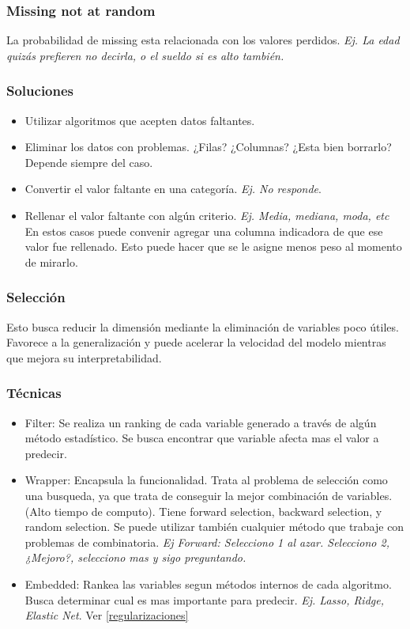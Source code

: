 \documentclass[titlepage,a4paper]{article}
\begin{document}
\subsubsection*{Missing not at random}
La probabilidad de missing esta relacionada con los valores perdidos. \textit{Ej. La edad quizás prefieren no decirla, o el sueldo si es alto también.}

\subsubsection*{Soluciones}
\begin{itemize}
    \item Utilizar algoritmos que acepten datos faltantes.
    \item Eliminar los datos con problemas. ¿Filas? ¿Columnas? ¿Esta bien borrarlo? Depende siempre del caso.
    \item Convertir el valor faltante en una categoría. \textit{Ej. No responde}.
    \item Rellenar el valor faltante con algún criterio. \textit{Ej. Media, mediana, moda, etc} En estos casos puede convenir agregar una columna indicadora de que ese valor fue rellenado. Esto puede hacer que se le asigne menos peso al momento de mirarlo.
\end{itemize}

\subsubsection{Selección}
Esto busca reducir la dimensión mediante la eliminación de variables poco útiles. Favorece a la generalización y puede acelerar la velocidad del modelo mientras que mejora su interpretabilidad.

\subsubsection*{Técnicas}
\begin{itemize}
    \item Filter: Se realiza un ranking de cada variable generado a través de algún método estadístico. Se busca encontrar que variable afecta mas el valor a predecir.
    \item Wrapper: Encapsula la funcionalidad. Trata al problema de selección como una busqueda, ya que trata de conseguir la mejor combinación de variables. (Alto tiempo de computo). Tiene forward selection, backward selection, y random selection. Se puede utilizar también cualquier método que trabaje con problemas de combinatoria. \textit{Ej Forward: Selecciono 1 al azar. Selecciono 2, ¿Mejoro?, selecciono mas y sigo preguntando.}
    \item Embedded: Rankea las variables segun métodos internos de cada algoritmo. Busca determinar cual es mas importante para predecir. \textit{Ej. Lasso, Ridge, Elastic Net}. Ver \ref{regularizaciones}
\end{itemize}
\end{document}
